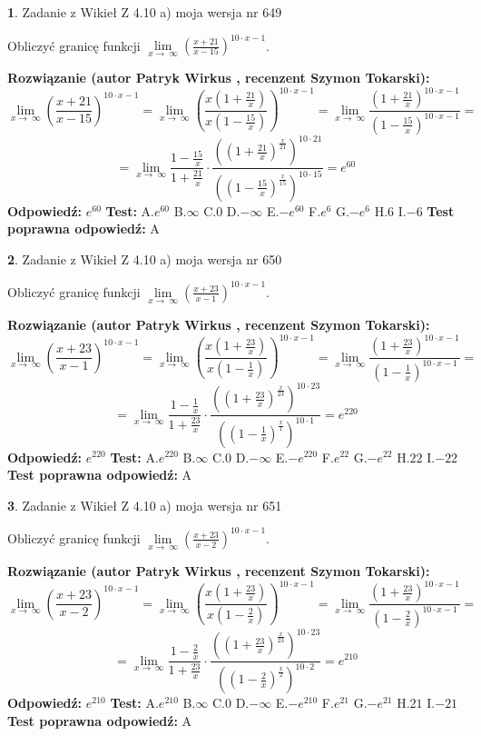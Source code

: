 \documentclass[12pt, a4paper]{article}
\theoremstyle{definition} %
\newtheorem{zad}{}
\newcommand{\zadStart}[1]{\begin{zad}#1\newline}
\newcommand{\zadStop}{\end{zad}}
\newcommand{\rozwStart}[2]{\noindent \textbf{Rozwiązanie (autor #1 , recenzent #2): }\newline}
\newcommand{\rozwStop}{\newline}
\newcommand{\odpStart}{\noindent \textbf{Odpowiedź:}\newline}
\newcommand{\odpStop}{\newline}
\newcommand{\testStart}{\noindent \textbf{Test:}\newline}
\newcommand{\testStop}{\newline}
\newcommand{\kluczStart}{\noindent \textbf{Test poprawna odpowiedź:}\newline}
\newcommand{\kluczStop}{\newline}
\begin{document}
\zadStart{Zadanie z Wikieł Z 4.10 a) moja wersja nr 649}

Obliczyć granicę funkcji  $\lim\limits_{x\to\ \infty}(\frac{x+21}{x-15})^{10\cdot x-1}$.
\zadStop
\rozwStart{Patryk Wirkus}{Szymon Tokarski}
$$\lim\limits_{x\to\ \infty}(\frac{x+21}{x-15})^{10\cdot x-1} = \lim\limits_{x\to\ \infty}(\frac{x(1+\frac{21}{x})}{x(1-\frac{15}{x})})^{10\cdot x-1}=\lim\limits_{x\to\ \infty}\frac{(1+\frac{21}{x})^{10\cdot x-1}}{(1-\frac{15}{x})^{10\cdot x-1}}=$$
$$=\lim\limits_{x\to\ \infty}\frac{1-\frac{15}{x}}{1+\frac{21}{x}}\cdot\frac{((1+\frac{21}{x})^{\frac{x}{21}})^{10\cdot21}}{((1-\frac{15}{x})^{\frac{x}{15}})^{10\cdot15}}=e^{60}$$
\rozwStop
\odpStart
$e^{60}$
\odpStop
\testStart
A.$e^{60}$ B.$\infty$ C.$0$ D.$-\infty$ E.$-e^{60}$
F.$e^{6}$ G.$-e^{6}$
H.$6$
I.$-6$
\testStop
\kluczStart
A
\kluczStop



\zadStart{Zadanie z Wikieł Z 4.10 a) moja wersja nr 650}

Obliczyć granicę funkcji  $\lim\limits_{x\to\ \infty}(\frac{x+23}{x-1})^{10\cdot x-1}$.
\zadStop
\rozwStart{Patryk Wirkus}{Szymon Tokarski}
$$\lim\limits_{x\to\ \infty}(\frac{x+23}{x-1})^{10\cdot x-1} = \lim\limits_{x\to\ \infty}(\frac{x(1+\frac{23}{x})}{x(1-\frac{1}{x})})^{10\cdot x-1}=\lim\limits_{x\to\ \infty}\frac{(1+\frac{23}{x})^{10\cdot x-1}}{(1-\frac{1}{x})^{10\cdot x-1}}=$$
$$=\lim\limits_{x\to\ \infty}\frac{1-\frac{1}{x}}{1+\frac{23}{x}}\cdot\frac{((1+\frac{23}{x})^{\frac{x}{23}})^{10\cdot23}}{((1-\frac{1}{x})^{\frac{x}{1}})^{10\cdot1}}=e^{220}$$
\rozwStop
\odpStart
$e^{220}$
\odpStop
\testStart
A.$e^{220}$ B.$\infty$ C.$0$ D.$-\infty$ E.$-e^{220}$
F.$e^{22}$ G.$-e^{22}$
H.$22$
I.$-22$
\testStop
\kluczStart
A
\kluczStop



\zadStart{Zadanie z Wikieł Z 4.10 a) moja wersja nr 651}

Obliczyć granicę funkcji  $\lim\limits_{x\to\ \infty}(\frac{x+23}{x-2})^{10\cdot x-1}$.
\zadStop
\rozwStart{Patryk Wirkus}{Szymon Tokarski}
$$\lim\limits_{x\to\ \infty}(\frac{x+23}{x-2})^{10\cdot x-1} = \lim\limits_{x\to\ \infty}(\frac{x(1+\frac{23}{x})}{x(1-\frac{2}{x})})^{10\cdot x-1}=\lim\limits_{x\to\ \infty}\frac{(1+\frac{23}{x})^{10\cdot x-1}}{(1-\frac{2}{x})^{10\cdot x-1}}=$$
$$=\lim\limits_{x\to\ \infty}\frac{1-\frac{2}{x}}{1+\frac{23}{x}}\cdot\frac{((1+\frac{23}{x})^{\frac{x}{23}})^{10\cdot23}}{((1-\frac{2}{x})^{\frac{x}{2}})^{10\cdot2}}=e^{210}$$
\rozwStop
\odpStart
$e^{210}$
\odpStop
\testStart
A.$e^{210}$ B.$\infty$ C.$0$ D.$-\infty$ E.$-e^{210}$
F.$e^{21}$ G.$-e^{21}$
H.$21$
I.$-21$
\testStop
\kluczStart
A
\kluczStop
\end{document}
